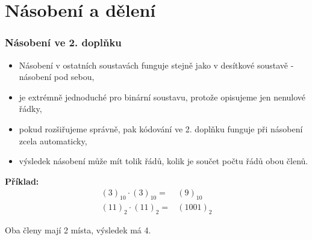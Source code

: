 \section{\texorpdfstring{Násobení a dělení}{Nasobeni a deleni}}

  \begin{frame}
    \frametitle{Násobení ve 2. doplňku}
    \boldmath
    
    \begin{itemize}
      \item Násobení v ostatních soustavách funguje stejně jako v desítkové soustavě - násobení pod sebou,
      \item je extrémně jednoduché pro binární soustavu, protože opisujeme jen nenulové řádky,
      \item pokud rozšiřujeme správně, pak kódování ve 2. doplňku funguje při násobení zcela automaticky,
      \item výsledek násobení může mít tolik řádů, kolik je součet počtu řádů obou členů.
    \end{itemize}
    
      \textbf{Příklad:}    
      \begin{align*}
        (3)_{10} \cdot (3)_{10} =& (9)_{10} \\
        (11)_{2} \cdot (11)_{2} =& (1001)_{2}
      \end{align*}
      
      Oba členy mají 2 místa, výsledek má 4.
	\end{frame}
  
